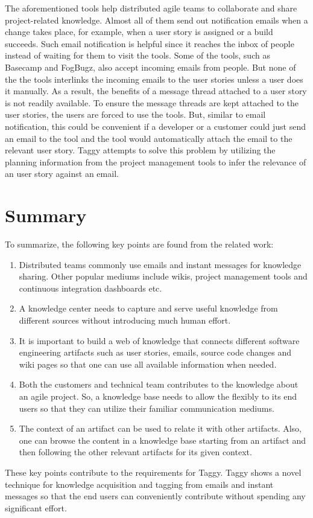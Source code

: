 The aforementioned tools help distributed agile teams to collaborate and share project-related knowledge. Almost all of them send out notification emails when a change takes place, for example, when a user story is assigned or a build succeeds. Such email notification is helpful since it reaches the inbox of people instead of waiting for them to visit the tools. Some of the tools, such as Basecamp and FogBugz, also accept incoming emails from people. But none of the the tools interlinks the incoming emails to the user stories unless a user does it manually. As a result, the benefits of a message thread attached to a user story is not readily available. To ensure the message threads are kept attached to the user stories, the users are forced to use the tools. But, similar to email notification, this could be convenient if a developer or a customer could just send an email to the tool and the tool would automatically attach the email to the relevant user story. Taggy attempts to solve this problem by utilizing the planning information from the project management tools to infer the relevance of an user story against an email.

\section{Summary}
To summarize, the following key points are found from the related work:
\begin{enumerate}
	\item Distributed teams commonly use emails and instant messages for knowledge sharing. Other popular mediums include wikis, project management tools and continuous integration dashboards etc.
	\item A knowledge center needs to capture and serve useful knowledge from different sources without introducing much human effort.
	\item It is important to build a web of knowledge that connects different software engineering artifacts such as user stories, emails, source code changes and wiki pages so that one can use all available information when needed.
	\item Both the customers and technical team contributes to the knowledge about an agile project. So, a knowledge base needs to allow the flexibly to its end users so that they can utilize their familiar communication mediums.
	\item The context of an artifact can be used to relate it with other artifacts. Also, one can browse the content in a knowledge base starting from an artifact and then following the other relevant artifacts for its given context.
\end{enumerate}
These key points contribute to the requirements for Taggy. Taggy shows a novel technique for knowledge acquisition and tagging from emails and instant messages so that the end users can conveniently contribute without spending any significant effort.

